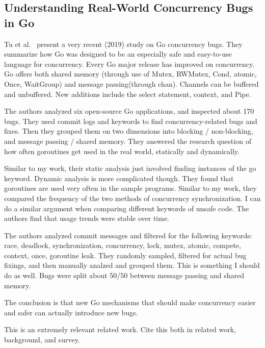 
\subsection{Understanding Real-World Concurrency Bugs in Go}
\label{subsec:understanding-real-world-concurrency-bugs-in-go}

Tu et al.~\cite{tu2019} present a very recent (2019) study on Go concurrency bugs.
They summarize how Go was designed to be an especially safe and easy-to-use language for concurrency.
Every Go major release has improved on concurrency.
Go offers both shared memory (through use of Mutex, RWMutex, Cond, atomic, Once, WaitGroup) and message passing(through
chan).
Channels can be buffered and unbuffered.
New additions include the select statement, context, and Pipe.

The authors analyzed six open-source Go applications, and inspected about 170 bugs.
They used commit logs and keywords to find concurrency-related bugs and fixes.
Then they grouped them on two dimensions into blocking / non-blocking, and message passing / shared memory.
They answered the research question of how often goroutines get used in the real world, statically and dynamically.

Similar to my work, their static analysis just involved finding instances of the go keyword.
Dynamic analysis is more complicated though.
They found that goroutines are used very often in the sample programs.
Similar to my work, they compared the frequency of the two methods of concurrency synchronization.
I can do a similar argument when comparing different keywords of unsafe code.
The authors find that usage trends were stable over time.

The authors analyzed commit messages and filtered for the following keywords: race, deadlock, synchronization,
concurrency, lock, mutex, atomic, compete, context, once, goroutine leak.
They randomly sampled, filtered for actual bug fixings, and then manually analzed and grouped them.
This is something I should do as well.
Bugs were split about 50/50 between message passing and shared memory.

The conclusion is that new Go mechanisms that should make concurrency easier and safer can actually introduce new bugs.

This is an extremely relevant related work.
Cite this both in related work, background, and survey.